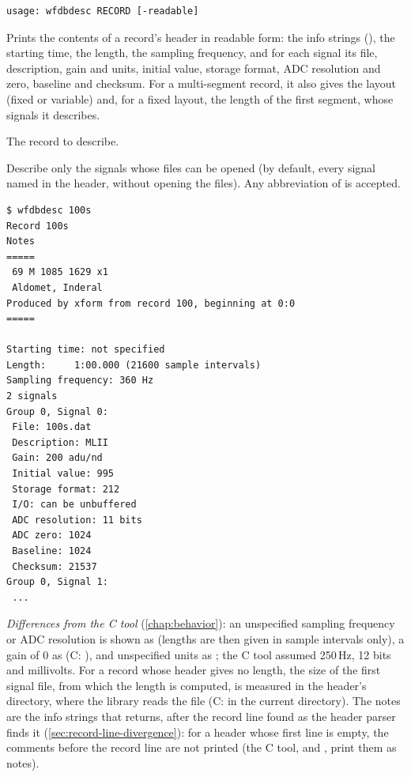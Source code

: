 \begin{lstlisting}[style=signature,language={}]
usage: wfdbdesc RECORD [-readable]
\end{lstlisting}
Prints the contents of a record's header in readable form: the info strings (),
the starting time, the length, the sampling frequency, and for each signal its file,
description, gain and units, initial value, storage format, ADC resolution and zero,
baseline and checksum. For a multi-segment record, it also gives the layout (fixed or
variable) and, for a fixed layout, the length of the first segment, whose signals it
describes.
\begin{params}
\item[RECORD] The record to describe.
\item[-readable] Describe only the signals whose files can be opened (by default, every
  signal named in the header, without opening the files). Any abbreviation of
   is accepted.
\end{params}
\begin{lstlisting}[style=text]
$ wfdbdesc 100s
Record 100s
Notes
=====
 69 M 1085 1629 x1
 Aldomet, Inderal
Produced by xform from record 100, beginning at 0:0
=====

Starting time: not specified
Length:     1:00.000 (21600 sample intervals)
Sampling frequency: 360 Hz
2 signals
Group 0, Signal 0:
 File: 100s.dat
 Description: MLII
 Gain: 200 adu/nd
 Initial value: 995
 Storage format: 212
 I/O: can be unbuffered
 ADC resolution: 11 bits
 ADC zero: 1024
 Baseline: 1024
 Checksum: 21537
Group 0, Signal 1:
 ...
\end{lstlisting}
\textit{Differences from the C tool} (\cref{chap:behavior}): an unspecified sampling
frequency or ADC resolution is shown as  (lengths are then given in
sample intervals only), a gain of 0 as  (C:
), and unspecified units as ; the C tool assumed
250\,Hz, 12 bits and millivolts. For a record whose header gives no length, the size of the
first signal file, from which the length is computed, is measured in the header's
directory, where the library reads the file (C: in the current directory). The notes are
the info strings that  returns, after the record line found as the header
parser finds it (\cref{sec:record-line-divergence}): for a header whose first line is
empty, the comments before the record line are not printed (the C tool, and
, print them as notes).

